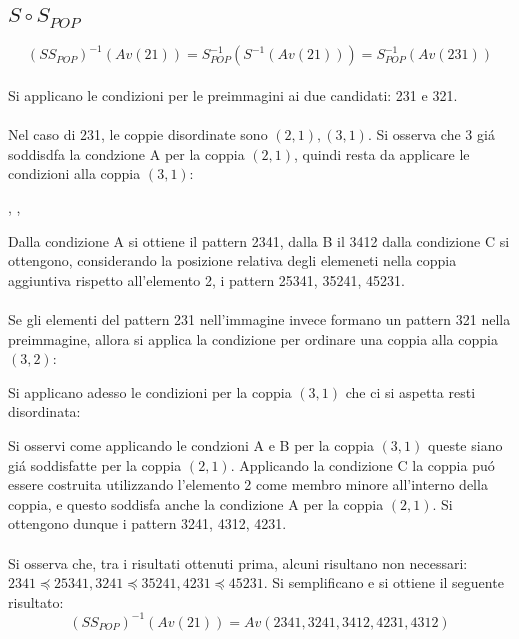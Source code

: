 \subsection*{$S\circ{S_{POP}}$}
$$(S{S_{POP}})^{-1}(Av(21)) = S_{POP}^{-1}(S^{-1}(Av(21))) = S_{POP}^{-1}(Av(231))$$
\\Si applicano le condizioni per le preimmagini ai due candidati: 231 e 321.\\\\
Nel caso di 231, le coppie disordinate sono $(2,1),(3,1)$. Si osserva che 3 gi\'a soddisdfa la condzione A per la coppia $(2,1)$, quindi resta da applicare le condizioni alla coppia $(3,1)$:
\begin{center}
,
,
\end{center}
Dalla condizione A si ottiene il pattern 2341, dalla B il 3412 dalla condizione C si ottengono, considerando la posizione relativa degli elemeneti nella coppia aggiuntiva rispetto all'elemento 2, i pattern 25341, 35241, 45231.\\\\
Se gli elementi del pattern 231 nell'immagine invece formano un pattern 321 nella preimmagine, allora si applica la condizione per ordinare una coppia alla coppia $(3,2)$:
\begin{center}
\end{center}
Si applicano adesso le condizioni per la coppia $(3,1)$ che ci si aspetta resti disordinata:
\begin{center}
\end{center}
Si osservi come applicando le condzioni A e B per la coppia $(3,1)$ queste siano gi\'a soddisfatte per la coppia $(2,1)$. Applicando la condizione C la coppia pu\'o essere costruita utilizzando l'elemento 2 come membro minore all'interno della coppia, e questo soddisfa anche la condizione A per la coppia $(2,1)$. Si ottengono dunque i pattern 3241, 4312, 4231.\\\\
Si osserva che, tra i risultati ottenuti prima, alcuni risultano non necessari: $2341\preceq25341, 3241\preceq35241, 4231\preceq45231$. Si semplificano e si ottiene il seguente risultato:
$$(S{S_{POP}})^{-1}(Av(21)) = Av(2341, 3241, 3412, 4231, 4312)$$
